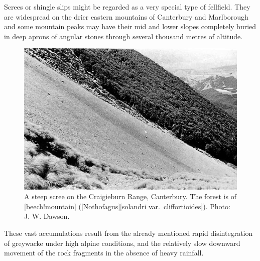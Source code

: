 Screes or shingle slips might be regarded as a very special type of fellfield.
They are widespread on the drier eastern mountains of Canterbury and Marlborough and some mountain peaks may have their mid and lower slopes completely buried in deep aprons of angular stones through several thousand metres of altitude.
\begin{figure}[t]
	\centering
	\includegraphics[width=\textwidth]{graphics/figure111craigieburn.jpg}
	\caption[A steep scree on the Craigieburn Range]{A steep scree on the Craigieburn Range, Canterbury.
	The forest is of [beech!mountain] ([Nothofagus][solandri var.\ cliffortioides]).
	Photo: J. W. Dawson.}%
	\label{fig:111craigieburn}
\end{figure}
These vast accumulations result from the already mentioned rapid disintegration of greywacke under high alpine conditions, and the relatively slow downward movement of the rock fragments in the absence of heavy rainfall.

